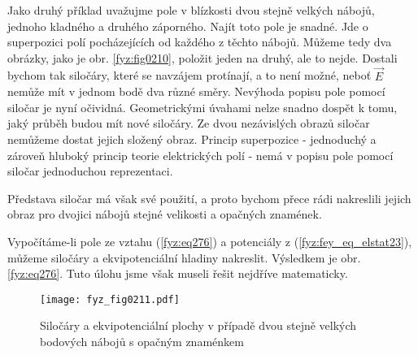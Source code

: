     Jako druhý příklad uvažujme pole v blízkosti dvou stejně velkých nábojů, jednoho kladného a 
    druhého záporného. Najít toto pole je snadné. Jde o superpozici polí pocházejících od každého z 
    těchto nábojů. Můžeme tedy dva obrázky, jako je obr. \ref{fyz:fig0210}, položit jeden 
    na druhý, ale to nejde. Dostali bychom tak siločáry, které se navzájem protínají, a to není 
    možné, neboť \(\vec{E}\) nemůže mít v jednom bodě dva různé směry. Nevýhoda popisu pole pomocí 
    siločar je nyní očividná. Geometrickými úvahami nelze snadno dospět k tomu, jaký průběh budou 
    mít nové siločáry. Ze dvou nezávislých obrazů siločar nemůžeme dostat jejich složený obraz. 
    Princip superpozice - jednoduchý a zároveň hluboký princip teorie elektrických polí - nemá v 
    popisu pole pomocí siločar jednoduchou reprezentaci.
    
    Představa siločar má však své použití, a proto bychom přece rádi nakreslili jejich obraz pro 
    dvojici nábojů stejné velikosti a opačných znamének.
    
    Vypočítáme-li pole ze vztahu (\ref{fyz:eq276}) a potenciály z 
    (\ref{fyz:fey_eq_elstat23}), můžeme siločáry a ekvipotenciální hladiny nakreslit. Výsledkem je 
    obr. \ref{fyz:eq276}. Tuto úlohu jsme však museli řešit nejdříve matematicky.
    \begin{figure}[ht!]
     \centering
     \texttt{[image: fyz\_fig0211.pdf]}
     \caption[Siločáry a ekvipotenciální plochy]{Siločáry a ekvipotenciální plochy v případě dvou 
              stejně velkých bodových nábojů s opačným znaménkem}
     \label{fyz:fig0211}
    \end{figure}


